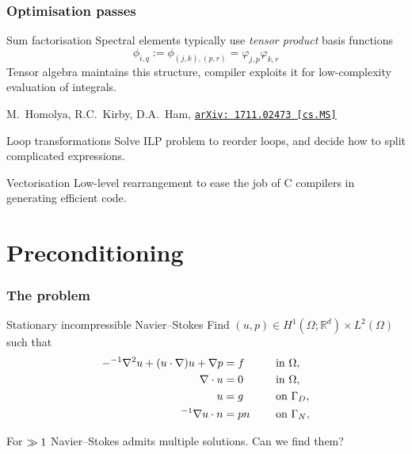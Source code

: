 \documentclass[presentation, 10pt]{beamer}
\newcommand{\arxivlink}[2]{%
  \href{https://www.arxiv.org/abs/#1}%
  {\texttt{arXiv:\,#1\,[#2]}}%
}
\let\Re\relax
\DeclareMathOperator{\Re}{Re}
\newcommand{\honev}{\ensuremath{{H}^1(\Omega; \mathbb{R}^d)}\xspace}
\newcommand{\ltwo}{\ensuremath{{L}^2(\Omega)}\xspace}
\newcommand{\advect}[2]{\ensuremath{(#2 \cdot \nabla) #1}}
\begin{document}
\begin{frame}[t]
  \frametitle{Optimisation passes}
  \begin{block}{Sum factorisation}
    \vspace{0.25\baselineskip}
    Spectral elements typically use \emph{tensor product} basis functions
    \begin{equation*}
      \phi_{i,q} := \phi_{(j,k),(p,r)} = \varphi_{j,p}\varphi_{k,r}
    \end{equation*}
    Tensor algebra maintains this structure, compiler exploits it for
    low-complexity evaluation of integrals.
    \vspace{-\baselineskip}
    \begin{flushright}
      {\scriptsize M.~Homolya, R.C.~Kirby, D.A.~Ham, \arxivlink{1711.02473}{cs.MS}\nocite{Homolya:2017a}}
    \end{flushright}
  \end{block}
  \vspace{-0.5\baselineskip}
  \begin{block}{Loop transformations}
    \vspace{0.25\baselineskip}
    Solve ILP problem to reorder loops, and decide how to split
    complicated expressions.\nocite{Luporini:2017}
  \end{block}
  \begin{block}{Vectorisation}
    \vspace{0.25\baselineskip}
    Low-level rearrangement to ease the job of C compilers in
    generating efficient code.\nocite{Luporini:2015}
  \end{block}

\end{frame}

\section{Preconditioning}
\begin{frame}[t]
  \frametitle{The problem}
  \begin{block}{Stationary incompressible Navier--Stokes}
    \vspace{0.25\baselineskip}
    Find $(u, p) \in \honev \times \ltwo$ such that
    \begin{alignat*}{2}
      -  \Re^{-1} \nabla^2 u + \advect{u}{u} + \nabla p &= f \quad && \text{ in } \Omega, \\
      \nabla \cdot u &= 0 \quad && \text{ in } \Omega, \\
      u &= g \quad && \text{ on } \Gamma_D, \\
      \Re^{-1} \nabla u \cdot n &= pn \quad && \text{ on } \Gamma_N,
    \end{alignat*}

    For $\Re \gg 1$ Navier--Stokes admits multiple solutions. Can we find them?
  \end{block}
  
\end{frame}
\end{document}
